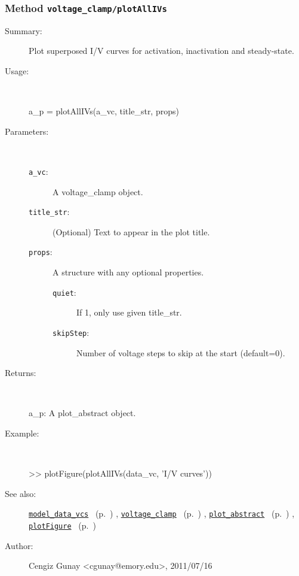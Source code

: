 \subsubsection[Method \texttt{plotAllIVs}]{Method \texttt{voltage\_clamp/plotAllIVs}}%
%
\label{ref_voltage_clamp__plotAllIVs}%
\hypertarget{ref_voltage_clamp__plotAllIVs}{}%
\begin{description}
\item[Summary:]Plot superposed I/V curves for activation, inactivation and steady-state.
%
\item[Usage:]~%
\begin{lyxcode}%
a\_p = plotAllIVs(a\_vc, title\_str, props)
%
\end{lyxcode}%
%
%
\item[Parameters:]~
\begin{description}%
\item[\texttt{a\_vc}:]
 A voltage\_clamp object.
\item[\texttt{title\_str}:]
 (Optional) Text to appear in the plot title.
\item[\texttt{props}:]
 A structure with any optional properties.
\begin{description}%
\item[\texttt{quiet}:]
 If 1, only use given title\_str.
\item[\texttt{skipStep}:]
 Number of voltage steps to skip at the start (default=0).
\end{description}%
\end{description}%
%
\item[Returns:
]~

   a\_p: A plot\_abstract object.
%
\item[Example:]~
\begin{lyxcode} >> plotFigure(plotAllIVs(data\_vc, 'I/V curves'))
\\%
\end{lyxcode}
%
\item[See also:]%
\hyperlink{ref_model_data_vcs}{\texttt{model\_data\_vcs}}%
\ (p.~\pageref{ref_model_data_vcs})%
%
, \hyperlink{ref_voltage_clamp}{\texttt{voltage\_clamp}}%
\ (p.~\pageref{ref_voltage_clamp})%
%
, \hyperlink{ref_plot_abstract}{\texttt{plot\_abstract}}%
\ (p.~\pageref{ref_plot_abstract})%
%
, \hyperlink{ref_plotFigure}{\texttt{plotFigure}}%
\ (p.~\pageref{ref_plotFigure})%
%
%
\item[Author:]%
Cengiz Gunay <cgunay@emory.edu>, 2011/07/16
%
\end{description}
\methodline%
